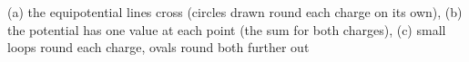 (a) the equipotential lines cross (circles drawn round each charge on its own), (b) the potential has one value at each point (the sum for both charges), (c) small loops round each charge, ovals round both further out
